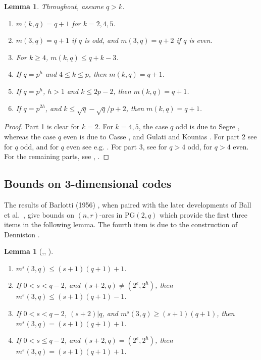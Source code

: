 \documentclass[11pt,a4paper]{amsart}
\theoremstyle{plain}
\newtheorem{lemma}[theorem]{Lemma}
\theoremstyle{definition}
\theoremstyle{remark}
\begin{document}
	\begin{lemma}\label{lem: Bounds on MDS codes}
		Throughout, assume $q>k$.
		\begin{enumerate}
			\item $m(k,q)= q+1$ for $k=2,4, 5$.  \label{part 1: lem: Bounds on MDS codes}
			\item $m(3,q)= q+1$ if $q$ is odd, and  $m(3,q)= q+2$ if $q$ is even. \label{part 2: lem: Bounds on MDS codes}
			\item For $k\ge 4 $, $m(k,q)\le q+k-3$. 	\label{part 3: lem: Bounds on MDS codes}
			\item If $q=p^h$ and $4\le k \le p$, then $m(k,q)=q+1$.  \label{part 4: lem: Bounds on MDS codes}
			\item If $q=p^h$, $h>1$ and $ k \le 2p-2$, then $m(k,q)=q+1$.  \label{part 5: lem: Bounds on MDS codes}
			\item If $q=p^{2h}$,  and $ k \le \sqrt{q}-\sqrt{q}/p+2$, then $m(k,q)=q+1$. \label{part 6: lem: Bounds on MDS codes}
		\end{enumerate}
	\end{lemma}
	\begin{proof}
		Part 1 is clear for $k=2$. For $k=4,5$, the case $q$ odd is due to Segre \cite{MR0075608}, whereas the case $q$ even is due to Casse \cite{MR684151}, and  Gulati and Kounias \cite{Gulati1973}.  For part 2 see \cite{Bose1947} for $q$ odd, and for $q$ even see e.g. \cite{Hirschfeld1979}. For part 3, see \cite{MR0075608} for $q>4$ odd,  \cite{MR0253138} for $q>4$ even. For the remaining parts, see \cite{Ball2012a}, \cite{Ball2019}.
	\end{proof}

	\subsection{Bounds on 3-dimensional codes}

	The results of Barlotti (1956) \cite{MR0083141}, when paired with the later developments of Ball et al.\ \cite{MR1466573}, give bounds on $(n,r)$-arcs in PG$(2,q)$ which provide the first three items in the following lemma. The fourth item is due to the construction of Denniston \cite{MR0239991}.

	\begin{lemma}[\cite{MR0083141},\cite{MR1466573}, \cite{MR0239991}]  \label{lem: Barlotti 3d}  \leavevmode \vspace*{-2mm}
		\begin{enumerate}
			\item $m^s(3,q)\le (s+1)(q+1)+1$.
			\item  If  $0<s< q-2$, and $(s+2,q) \ne (2^e,2^h)$,  then $m^s(3,q)\le (s+1)(q+1)-1$.
			\item  If  $0<s< q-2$, $(s+2)|q$, and $m^s(3,q) \ge (s+1)(q+1)$, then $ m^s(3,q)= (s+1)(q+1)+1$.
			\item  If  $0<s\le q-2$, and $(s+2,q) = (2^e,2^h)$,  then $m^s(3,q)= (s+1)(q+1)+1$.
		\end{enumerate}
	\end{lemma}
\end{document}
